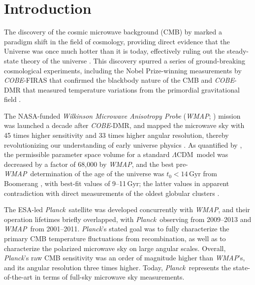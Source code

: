 \documentclass[twocolumn]{../../common/aa}
\def\WMAP{\emph{WMAP}}
\def\COBE{\emph{COBE}}
\def\Planck{\emph{Planck}}
\def\LCDM{$\Lambda$CDM}
\begin{document}

\maketitle

\tableofcontents



\section{Introduction}
\label{sec:introduction}

The discovery of the cosmic microwave background (CMB) by \citet{penzias:1965} marked a paradigm shift in the field of cosmology, providing direct evidence that the Universe was once much hotter than it is today, effectively ruling out the steady-state theory of the universe \citep{dicke:1965}. This discovery spurred a series of ground-breaking cosmological experiments, including the Nobel Prize-winning measurements by \COBE-FIRAS that confirmed the blackbody nature of the CMB \citep{mather:1994} and \COBE-DMR that measured temperature variations from the primordial gravitational field \citep{smoot:1992}.

The NASA-funded \textit{Wilkinson Microwave Anisotropy Probe} (\WMAP; \citealp{bennett2003:MAP}) mission was launched a decade after \COBE-DMR, and mapped the microwave sky with 45 times higher sensitivity and 33 times higher angular resolution, thereby revolutionizing our understanding of early universe physics \citep{bennett2003:MAP}. As quantified by \citet{bennett2012}, the permissible parameter space volume for a standard \LCDM\ model was decreased by a factor of 68,000 by \WMAP, and the best pre-\WMAP\ determination of the age of the universe was $t_0<14\,\mathrm{Gyr}$ from Boomerang \citep{lange:2001}, with best-fit values of 9--11\,Gyr; the latter values in apparent contradiction with direct measurements of the oldest globular clusters \citep{hu:2001}.

The ESA-led \Planck\ satellite \citep{planck2016-l01} was developed concurrently with \WMAP, and their operation lifetimes briefly overlapped, with \Planck\ observing from 2009--2013 and \WMAP\ from 2001--2011. \Planck's stated goal was to fully characterize the primary CMB temperature fluctuations from recombination, as well as to characterize the polarized microwave sky on large angular scales.  Overall, \Planck's raw CMB sensitivity was an order of magnitude higher than \WMAP's, and its angular resolution three times higher. Today, \Planck\ represents the state-of-the-art in terms of full-sky microwave sky measurements.
\end{document}
